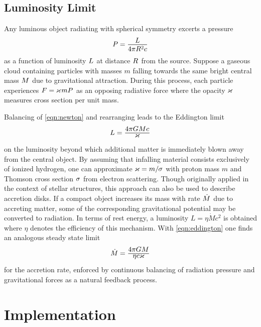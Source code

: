 \subsection*{Luminosity Limit}

Any luminous object radiating with spherical symmetry excerts a pressure
\begin{equation*}
	P = \frac{\raisebox{-0.3ex}{$L$}}{4\pi R^2 c}
\end{equation*}
as a function of luminosity $L \kern+0.5pt$ at distance $R \kern+0.5pt$ from the source.
Suppose a gaseous cloud containing particles with masses $m$ falling towards the same bright central mass $M \kern+0.5pt$
due to gravitational attraction. During this process, each particle experiences $F = \kern-0.3pt \varkappa \kern+0.7pt mP \kern+0.5pt$
as an opposing radiative force where the opacity $\kern-0.3pt \varkappa \kern+0.7pt$ measures cross section per unit mass.

\newpage Balancing of \eqref{eqn:newton} and rearranging leads to the Eddington limit
\begin{equation}
	L = \frac{\raisebox{-0.3ex}{$4\pi GM c \kern+0.4pt$}}{\raisebox{0.8ex}{$\varkappa$}}
	\label{eqn:eddington}
\end{equation}
on the luminosity beyond which additional matter is immediately blown away from the central object. By assuming that infalling
material consists exclusively of ionized hydrogen, one can approximate $\varkappa \kern-0.1pt = m / \kern-0.5pt \sigma \kern+0.3pt$
with proton mass $m$ and Thomson cross section $\sigma \kern+0.5pt$ from electron scattering. Though originally applied in the
context of stellar structures, this approach can also be used to describe accretion disks. If a compact object increases its mass
with rate $\dot{M} \kern+0.5pt$ due to accreting matter, some of the corresponding gravitational potential may be converted to
radiation. In terms of rest energy, a luminosity $L = \eta\dot{M}c^2$ is obtained where $\eta$ denotes the efficiency of this
mechanism. With \eqref{eqn:eddington} one finds an analogous steady state limit
\begin{equation*}
	\dot{M} \kern-0.2pt = \frac{\raisebox{-0.3ex}{$4\pi GM$}}{\raisebox{0.8ex}{$\eta c \varkappa$}}
\end{equation*}
for the accretion rate, enforced by continuous balancing of radiation pressure and gravitational forces as a natural feedback process.



\section{Implementation}
\label{sec:implementation}

